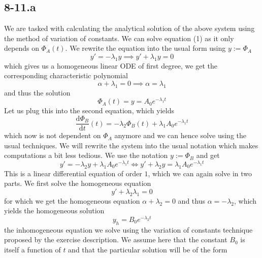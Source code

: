 \documentclass{article}
\begin{document}
\subsection*{8-11.a}
We are tasked with calculating the analytical solution of the above system using the method of variation of constants. We can solve equation (1) as it only depends on $\Phi_{A}\left(t\right)$. We rewrite the equation into the usual form using $y := \Phi_{A}$
\begin{equation*}
    y' = -\lambda_{1}y \implies y' +\lambda_{1}y = 0
\end{equation*}
which gives us a homogeneous linear ODE of first degree, we get the corresponding characteristic polynomial
\begin{equation*}
    \alpha + \lambda_{1} = 0 \implies \alpha = \lambda_{1}
\end{equation*}
and thus the solution
\begin{equation*}
    \Phi_{A}\left(t\right) = y = A_{0}e^{-\lambda_{1}t}
\end{equation*}
Let us plug this into the second equation, which yields
\begin{equation*}
    \frac{\mathrm{d}\Phi_{B}}{\mathrm{d} t}\left(t\right) = -\lambda_{2}\Phi_{B}\left(t\right) + \lambda_{1}A_{0}e^{-\lambda_{1}t}
\end{equation*}
which now is not dependent on $\Phi_{A}$ anymore and we can hence solve using the usual techniques. We will rewrite the system into the usual notation which makes computations a bit less tedious. We use the notation $y := \Phi_{B}$ and get
\begin{equation*}
    y' = -\lambda_{2}y + \lambda_{1}A_{0}e^{-\lambda_{1}t} \Longleftrightarrow y' +\lambda_{2}y =  \lambda_{1}A_{0}e^{-\lambda_{1}t}
\end{equation*}
This is a linear differential equation of order $1$, which we can again solve in two parts. We first solve the homogeneous equation
\begin{equation*}
    y' + \lambda_{2}\lambda_{1} = 0 
\end{equation*}
for which we get the homogeneous equation $\alpha + \lambda_{2} = 0$ and thus $\alpha = -\lambda_{2}$, which yields the homogeneous solution
\begin{equation*}
    y_{h} = B_{0}e^{-\lambda_{2}t}
\end{equation*}
the inhomogeneous equation we solve using the variation of constants technique proposed by the exercise description. We assume here that the constant $B_{0}$ is itself a function of $t$ and that the particular solution will be of the form 
\end{document}
